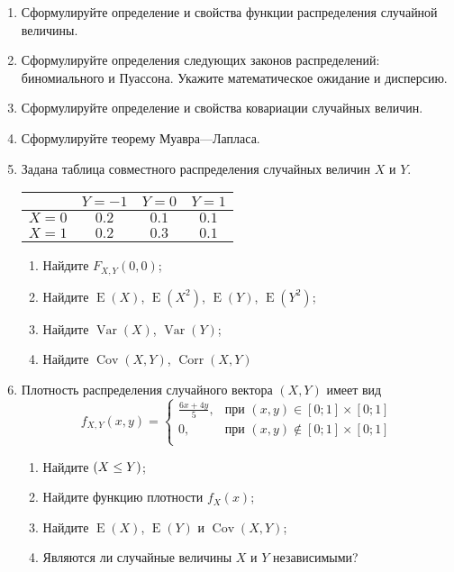 \documentclass[11pt]{article} %
\DeclareMathOperator{\Cov}{Cov}
\DeclareMathOperator{\Corr}{Corr}
\DeclareMathOperator{\Var}{Var}
\DeclareMathOperator{\E}{E}
\let\P\relax
\DeclareMathOperator{\P}{\mathbb{P}}
\begin{document}
\begin{enumerate}
\item Сформулируйте определение и свойства функции распределения случайной величины.
\item Сформулируйте определения следующих законов распределений: биномиального и Пуассона. Укажите математическое ожидание и дисперсию.
\item Сформулируйте определение и свойства ковариации случайных величин.
\item Сформулируйте теорему Муавра—Лапласа.

\item Задана таблица совместного распределения случайных величин $X$ и $Y$.
\begin{center}
\begin{tabular}{lccc}
\toprule
                       & $Y=-1$  & $Y=0$   & $Y=1$   \\ 
 \midrule
$X=0$                 & $0.2$ & $0.1$ & $0.1$ \\
 $X=1$                 & $0.2$ & $0.3$ & $0.1$ \\ 
 \bottomrule
\end{tabular}
\end{center}


\begin{enumerate}
    \item Найдите $F_{X,Y}(0, 0)$;
    \item Найдите $\E(X)$, $\E(X^2)$, $\E(Y)$, $\E(Y^2)$;
    \item Найдите $\Var(X)$, $\Var(Y)$;
    \item Найдите $\Cov(X, Y)$, $\Corr(X, Y)$
\end{enumerate}    
\item Плотность распределения случайного вектора $(X,Y)$ имеет вид
\[
f_{X,Y}(x,y) = 
\begin{cases} 
\frac{6x+4y}{5}, & \text{при } (x,y) \in [0;1] \times [0;1] \\ 
0 , & \text{при } (x,y) \not\in [0;1] \times [0;1] \\
\end{cases}
\]

\begin{enumerate}
\item Найдите $\P(X \leq Y)$;
\item Найдите функцию плотности $f_X(x)$;
\item Найдите $\E(X)$, $\E(Y)$ и $\Cov(X, Y)$;
\item Являются ли случайные величины $X$ и $Y$ независимыми?
\end{enumerate} 


\end{enumerate}
\end{document}
